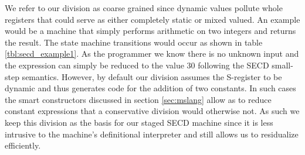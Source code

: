 \documentclass{article}
\theoremstyle{definition}
\begin{document}
We refer to our division as coarse grained since dynamic values pollute whole registers that could serve as either completely static or mixed valued. An example would be a machine that simply performs arithmetic on two integers and returns the result. The state machine transitions would occur as shown in table \ref{tbl:secd_example1}. As the programmer we know there is no unknown input and the expression can simply be reduced to the value 30 following the SECD small-step semantics. However, by default our division assumes the S-register to be dynamic and thus generates code for the addition of two constants. In such cases the smart constructors discussed in section \ref{sec:mslang} allow as to reduce constant expressions that a conservative division would otherwise not. As such we keep this division as the basis for our staged SECD machine since it is less intrusive to the machine's definitional interpreter and still allows us to residualize efficiently.
\end{document}
